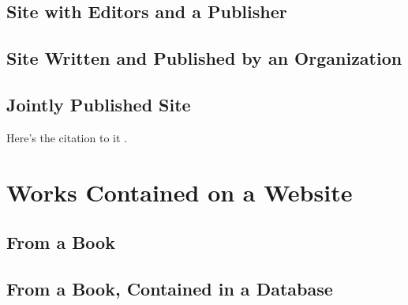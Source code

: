 \documentclass{article}
\begin{document}
\subsection{Site with Editors and a Publisher} %
\label{sub:site_with_editors_and_a_publisher}
\begin{refsection}
	\printbibliography[heading=none]
\end{refsection}
\subsection{Site Written and Published by an Organization} %
\label{sub:site_written_and_published_by_an_organization}
\begin{refsection}
	\printbibliography[heading=none]
\end{refsection}
\subsection{Jointly Published Site} %
\label{sub:jointly_published_site}
\begin{refsection}
	Here's the citation to it \autocite{Manifold:aa}.
	\printbibliography[heading=none]
\end{refsection}

\section{Works Contained on a Website} %
\label{sec:works_contained_on_a_website}
\subsection{From a Book} %
\label{sub:from_a_book}
\begin{refsection}
	\printbibliography[heading=none]
\end{refsection}
\subsection{From a Book, Contained in a Database} %
\label{sub:from_a_book_contained_in_a_database}
\begin{refsection}
	\printbibliography[heading=none]
\end{refsection}
\end{document}
